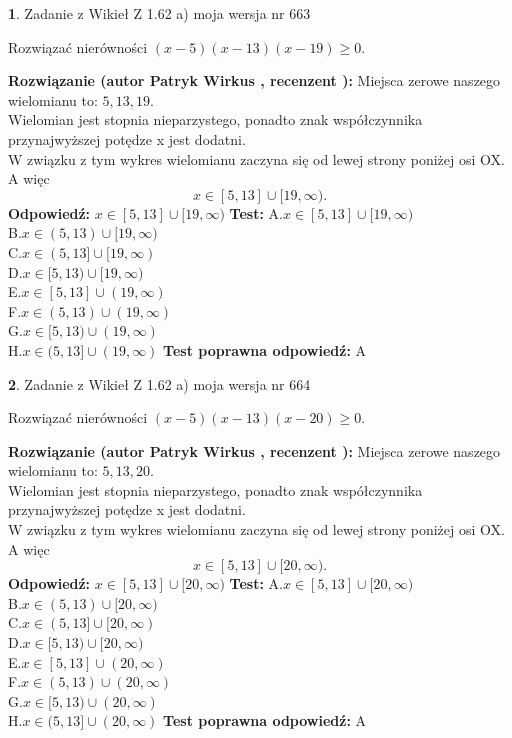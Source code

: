 \documentclass[12pt, a4paper]{article}
\theoremstyle{definition} %
\newtheorem{zad}{}
\newcommand{\zadStart}[1]{\begin{zad}#1\newline}
\newcommand{\zadStop}{\end{zad}}
\newcommand{\rozwStart}[2]{\noindent \textbf{Rozwiązanie (autor #1 , recenzent #2): }\newline}
\newcommand{\rozwStop}{\newline}
\newcommand{\odpStart}{\noindent \textbf{Odpowiedź:}\newline}
\newcommand{\odpStop}{\newline}
\newcommand{\testStart}{\noindent \textbf{Test:}\newline}
\newcommand{\testStop}{\newline}
\newcommand{\kluczStart}{\noindent \textbf{Test poprawna odpowiedź:}\newline}
\newcommand{\kluczStop}{\newline}
\begin{document}
\zadStart{Zadanie z Wikieł Z 1.62 a) moja wersja nr 663}

Rozwiązać nierówności $(x-5)(x-13)(x-19)\ge0$.
\zadStop
\rozwStart{Patryk Wirkus}{}
Miejsca zerowe naszego wielomianu to: $5, 13, 19$.\\
Wielomian jest stopnia nieparzystego, ponadto znak współczynnika przy\linebreak najwyższej potędze x jest dodatni.\\ W związku z tym wykres wielomianu zaczyna się od lewej strony poniżej osi OX. A więc $$x \in [5,13] \cup [19,\infty).$$
\rozwStop
\odpStart
$x \in [5,13] \cup [19,\infty)$
\odpStop
\testStart
A.$x \in [5,13] \cup [19,\infty)$\\
B.$x \in (5,13) \cup [19,\infty)$\\
C.$x \in (5,13] \cup [19,\infty)$\\
D.$x \in [5,13) \cup [19,\infty)$\\
E.$x \in [5,13] \cup (19,\infty)$\\
F.$x \in (5,13) \cup (19,\infty)$\\
G.$x \in [5,13) \cup (19,\infty)$\\
H.$x \in (5,13] \cup (19,\infty)$
\testStop
\kluczStart
A
\kluczStop



\zadStart{Zadanie z Wikieł Z 1.62 a) moja wersja nr 664}

Rozwiązać nierówności $(x-5)(x-13)(x-20)\ge0$.
\zadStop
\rozwStart{Patryk Wirkus}{}
Miejsca zerowe naszego wielomianu to: $5, 13, 20$.\\
Wielomian jest stopnia nieparzystego, ponadto znak współczynnika przy\linebreak najwyższej potędze x jest dodatni.\\ W związku z tym wykres wielomianu zaczyna się od lewej strony poniżej osi OX. A więc $$x \in [5,13] \cup [20,\infty).$$
\rozwStop
\odpStart
$x \in [5,13] \cup [20,\infty)$
\odpStop
\testStart
A.$x \in [5,13] \cup [20,\infty)$\\
B.$x \in (5,13) \cup [20,\infty)$\\
C.$x \in (5,13] \cup [20,\infty)$\\
D.$x \in [5,13) \cup [20,\infty)$\\
E.$x \in [5,13] \cup (20,\infty)$\\
F.$x \in (5,13) \cup (20,\infty)$\\
G.$x \in [5,13) \cup (20,\infty)$\\
H.$x \in (5,13] \cup (20,\infty)$
\testStop
\kluczStart
A
\kluczStop
\end{document}
